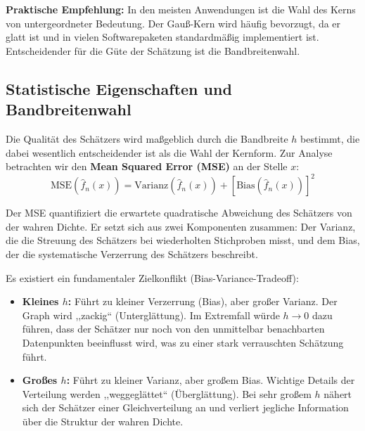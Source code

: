 \documentclass[a4paper, 11pt]{scrartcl}
\begin{document}
\textbf{Praktische Empfehlung:} In den meisten Anwendungen ist die Wahl des Kerns von untergeordneter Bedeutung. Der Gauß-Kern wird häufig bevorzugt, da er glatt ist und in vielen Softwarepaketen standardmäßig implementiert ist. Entscheidender für die Güte der Schätzung ist die Bandbreitenwahl.

\subsection{Statistische Eigenschaften und Bandbreitenwahl}

Die Qualität des Schätzers wird maßgeblich durch die Bandbreite $h$ bestimmt, die dabei wesentlich entscheidender ist als die Wahl der Kernform. Zur Analyse betrachten wir den \textbf{Mean Squared Error (MSE)} an der Stelle $x$:
\begin{equation}
	\text{MSE}(\hat{f}_n(x)) = \text{Varianz}(\hat{f}_n(x)) + [\text{Bias}(\hat{f}_n(x))]^2
\end{equation}

Der MSE quantifiziert die erwartete quadratische Abweichung des Schätzers von der wahren Dichte. Er setzt sich aus zwei Komponenten zusammen: Der Varianz, die die Streuung des Schätzers bei wiederholten Stichproben misst, und dem Bias, der die systematische Verzerrung des Schätzers beschreibt.

Es existiert ein fundamentaler Zielkonflikt (Bias-Variance-Tradeoff):
\begin{itemize}
	\item \textbf{Kleines $h$:} Führt zu kleiner Verzerrung (Bias), aber großer Varianz. Der Graph wird ,,zackig`` (Unterglättung). Im Extremfall würde $h \to 0$ dazu führen, dass der Schätzer nur noch von den unmittelbar benachbarten Datenpunkten beeinflusst wird, was zu einer stark verrauschten Schätzung führt.
	\item \textbf{Großes $h$:} Führt zu kleiner Varianz, aber großem Bias. Wichtige Details der Verteilung werden ,,weggeglättet`` (Überglättung). Bei sehr großem $h$ nähert sich der Schätzer einer Gleichverteilung an und verliert jegliche Information über die Struktur der wahren Dichte.
\end{itemize}
\end{document}
